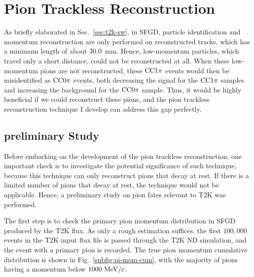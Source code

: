     \section{Pion Trackless Reconstruction}
       \label{sec:sel-tl}
       As briefly elaborated in Sec.~\ref{sec:t2k-sw}, in SFGD, particle identification and momentum reconstruction are only performed on reconstructed tracks, which has a minimum length of about $30.0$~mm. 
       Hence, low-momentum particles, which travel only a short distance, could not be reconstructed at all. 
       When these low-momentum pions are not reconstructed, these $\textrm{CC}1\pi$ events would then be misidentified as $\textrm{CC}0\pi$ events, both decreasing the signal for the $\textrm{CC}1\pi$ samples and increasing the background for the $\textrm{CC}0\pi$ sample. 
       Thus, it would be highly beneficial if we could reconstruct these pions, and the pion trackless reconstruction technique I develop can address this gap perfectly. 
     
       \subsection{preliminary Study}
       \label{sec:tl-ps}
         Before embarking on the development of the pion trackless reconstruction, one important check is to investigate the potential significance of such technique, because this technique can only reconstruct pions that decay at rest.
         If there is a limited number of pions that decay at rest, the technique would not be applicable.
         Hence, a preliminary study on pion fates relevant to T2K was performed.

         The first step is to check the primary pion momentum distribution in SFGD produced by the T2K flux.
         As only a rough estimation suffices, the first $100,000$ events in the T2K input flux file is passed through the T2K ND simulation, and the event with a primary pion is recorded.
         The true pion momentum cumulative distribution is shown in Fig.~\ref{subfig:pi-mom-cum}, with the majority of pions having a momentum below $1000~\textrm{MeV}/c$.

